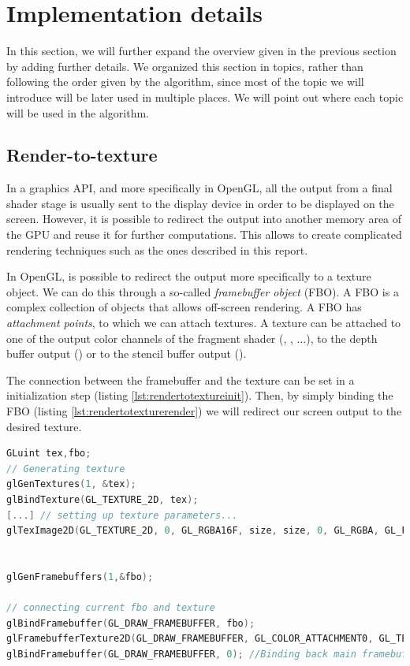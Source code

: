 \section{Implementation details}
In this section, we will further expand the overview  given in the previous section by adding further details. We organized this section in topics, rather than following the order given by the algorithm, since most of the topic we will introduce will be later used in multiple places. We will point out where each topic will be used in the algorithm.

\subsection{Render-to-texture}
In a graphics API, and more specifically in OpenGL, all the output from a final shader stage is usually sent to the display device in order to be displayed on the screen. However, it is possible to redirect the output into another memory area of the GPU and reuse it for further computations. This allows to create complicated rendering techniques such as the ones described in this report. 

In OpenGL, is possible to redirect the output more specifically to a texture object. We can do this through a so-called \emph{framebuffer object} (FBO). A FBO is a complex collection of objects that allows off-screen rendering. A FBO has \emph{attachment points}, to which we can attach textures. A texture can be attached to one of the output color channels of the fragment shader (, , ...), to the depth buffer output () or to the stencil buffer output ().

The connection between the framebuffer and the texture can be set in a initialization step (listing \ref{lst:rendertotextureinit}). Then, by simply binding the FBO (listing \ref{lst:rendertotexturerender}) we will redirect our screen output to the desired texture.

\begin{lstlisting}[language=C++,label=lst:rendertotextureinit,caption={Render to texture example, initilalization phase. Note the call to \gl{glFramebufferTexture2D}}]
GLuint tex,fbo;
// Generating texture
glGenTextures(1, &tex);
glBindTexture(GL_TEXTURE_2D, tex);
[...] // setting up texture parameters...
glTexImage2D(GL_TEXTURE_2D, 0, GL_RGBA16F, size, size, 0, GL_RGBA, GL_FLOAT, 0);


glGenFramebuffers(1,&fbo);

// connecting current fbo and texture
glBindFramebuffer(GL_DRAW_FRAMEBUFFER, fbo);
glFramebufferTexture2D(GL_DRAW_FRAMEBUFFER, GL_COLOR_ATTACHMENT0, GL_TEXTURE_2D, tex, 0);
glBindFramebuffer(GL_DRAW_FRAMEBUFFER, 0); //Binding back main framebuffer
\end{lstlisting}

